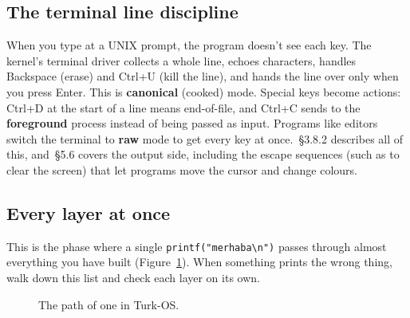 \documentclass[11pt,a4paper]{article}
\begin{document}
\subsection{The terminal line discipline}

When you type at a UNIX prompt, the program doesn't see each key. The kernel's terminal driver collects a whole line,
echoes characters, handles Backspace (erase) and Ctrl+U (kill the line), and hands the line over only when you press
Enter. This is \textbf{canonical} (cooked) mode. Special keys become actions: Ctrl+D at the start of a line means
end-of-file, and Ctrl+C sends  to the \textbf{foreground} process instead of being passed as input.
Programs like editors switch the terminal to \textbf{raw} mode to get every key at once. \OSDI\,\S3.8.2 describes all
of this, and \MOS\,\S5.6 covers the output side, including the escape sequences (such as \code{ESC [2J} to clear the
screen) that let programs move the cursor and change colours.

\subsection{Every layer at once}

This is the phase where a single \texttt{printf("merhaba\textbackslash n")} passes through almost everything you have built
(Figure~\ref{fig:layers}). When something prints the wrong thing, walk down this list and check each layer on its own.

\begin{figure}[htbp]
\centering
{}
\caption{The path of one  in Turk-OS.}
\label{fig:layers}
\end{figure}
\end{document}
